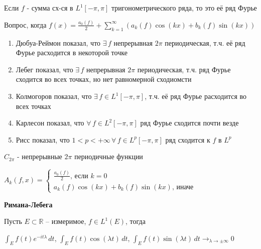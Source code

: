 \begin{remark}
    Если $f$ - сумма сх-ся в $L^1 [-\pi, \pi]$ тригонометрического ряда, то это её ряд Фурье

    Вопрос, когда $f (x) = \frac{a_0 (f)}{2} + \sum_{k = 1}^\infty (a_k (f) \cos (kx) + b_k (f) \sin (kx))$

    \begin{enumerate}
        \item {
            Дюбуа-Реймон показал, что $\exists \, f$ непрерывная $2\pi$ периодическая, т.ч. её ряд Фурье расходится в некоторой точке
        }
        \item {
            Лебег показал, что $\exists \, f$ непрерывная $2\pi$ периодическая, т.ч. ряд Фурье сходится во всех точках, но нет равномерной сходиомсти
        }
        \item {
            Колмогоров показал, что $\exists \, f \in L^1 [-\pi, \pi]$, т.ч. её ряд Фурье расходится во всех точках
        }
        \item {
            Карлесон показал, что $\forall \, f \in L^2 [-\pi, \pi]$ ряд Фурье сходится почти везде
        }
        \item {
            Рисс показал, что $1 < p < +\infty \, \forall \, f \in L^p [-\pi, \pi]$ ряд сходится к $f$ в $L^p$
        }
    \end{enumerate}

    $C_{2\pi}$ - непрерывные $2\pi$ периодичные функции

    $A_k (f, x) = \begin{cases}
        \frac{a_0(f)}{2} \text{, если $k = 0$} \\
        a_k (f) \cos (kx) + b_k (f) \sin (kx) \text{, иначе}
    \end{cases}$
\end{remark}


\begin{lemma}
    \textbf{Римана-Лебега}

    Пусть $E \subset \mathbb{R}$ -- измеримое, $f \in L^1 (E)$, тогда
    
    $\int_E f(t) e^{-i t \lambda} \, dt$, $\int_E f(t) \cos (\lambda t) \, dt$, $\int_E f(t) \sin (\lambda t) \, dt \rightarrow_{\lambda \to \pm \infty} 0$
\end{lemma}

